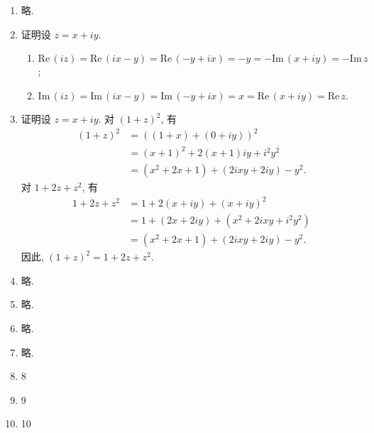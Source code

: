 \documentclass[a4paper, 11pt]{ctexart}
\newcommand{\re}{\mathrm{Re}\,}
\newcommand{\im}{\mathrm{Im}\,}
\begin{document}
\pagestyle{empty}
\begin{enumerate}
    \item %
        略.
    \item %
        {\heiti 证明}\quad 设 $z = x + iy$.
        \begin{enumerate}
            \item %
                $\re(iz) = \re(ix - y) = \re(-y + ix) = -y = -\im(x + iy) = -\im z$;
            \item %
                $\im(iz) = \im(ix - y) = \im(-y + ix) = x = \re(x + iy) = \re z$.
        \end{enumerate}
    \item %
        {\heiti 证明}\quad 设 $z = x + iy$. 对 $(1 + z)^2$, 有
        \begin{align*}
            (1 + z)^2 &= ((1+x) + (0+iy))^2 \\
                      &= (x+1)^2 + 2(x+1)iy + i^2y^2 \\
                      &= (x^2 + 2x + 1) + (2ixy + 2iy) - y^2.
        \end{align*}
        对 $1 + 2z + z^2$, 有
        \begin{align*}
            1 + 2z + z^2 &= 1 + 2(x + iy) + (x + iy)^2 \\
                         &= 1 + (2x + 2iy) + (x^2 + 2ixy + i^2y^2) \\
                         &= (x^2 + 2x + 1) + (2ixy + 2iy) - y^2.
        \end{align*}
        因此, $(1 + z)^2 = 1 + 2z + z^2$.
    \item %
        略.
    \item %
        略.
    \item %
        略.
    \item %
        略.
    \item 8
    \item 9
    \item 10
\end{enumerate}
\end{document}

